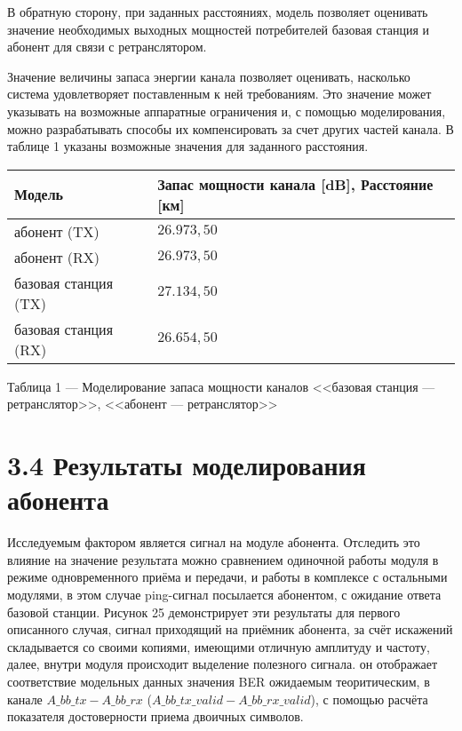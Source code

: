 \begin{onehalfspace}
В обратную сторону, при заданных расстояниях, модель позволяет оценивать значение необходимых выходных мощностей потребителей базовая станция и абонент для связи с ретранслятором.

Значение величины запаса энергии канала позволяет оценивать, насколько система удовлетворяет поставленным к ней требованиям. Это значение может указывать на возможные аппаратные ограничения и, с помощью моделирования, можно разрабатывать способы их компенсировать за счет других частей канала. В таблице 1 указаны возможные значения для заданного расстояния.

\begin{center}
		\begin{tabular}{|p{5cm}|p{6.5cm}|}
			\hline
			  Модель & Запас мощности канала [dB], 
  Расстояние [км] \\
			\hline
			абонент (TX) & $26.973, 50$ \\
			\hline
			абонент (RX) & $26.973, 50$\\
			\hline
			базовая станция (TX) & $27.134, 50$ \\	
			\hline
   базовая станция (RX) & $26.654, 50$\\
			\hline
		\end{tabular}
		\label{table:1}
  \end{center}
  \begin{center}
  Таблица 1 — Моделирование запаса мощности каналов <<базовая станция — ретранслятор>>, <<абонент — ретранслятор>>
	\end{center}


\end{onehalfspace}







\section*{\large{3.4 Результаты моделирования абонента}}
\begin{onehalfspace}
Исследуемым фактором является сигнал на модуле абонента. Отследить это влияние на значение результата можно сравнением одиночной работы модуля в режиме одновременного приёма и передачи, и работы в комплексе с остальными модулями, в этом случае ping-сигнал посылается абонентом, с ожидание ответа базовой станции. Рисунок 25 демонстрирует эти результаты для первого описанного случая, сигнал приходящий на приёмник абонента, за счёт искажений складывается со своими копиями, имеющими отличную амплитуду и частоту, далее, внутри модуля происходит выделение полезного сигнала. он отображает соответствие модельных данных значения BER ожидаемым теоритическим, в канале $A\_bb\_tx - A\_bb\_rx$ ($A\_bb\_tx\_valid - A\_bb\_rx\_valid$), с помощью расчёта показателя достоверности приема двоичных символов.
\end{onehalfspace}

